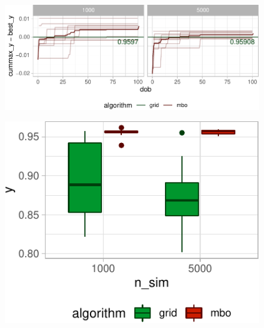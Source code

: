 \documentclass[bimj,fleqn]{w-art}
\theoremstyle{plain}
\theoremstyle{definition}
\begin{document}
\begin{figure}[htb]
\centering
  \begin{minipage}{0.64\textwidth}
    \centering
    \includegraphics[width=\linewidth]{generated/figures/plot_opt_path_5000.pdf}%
    \label{fig:plot_opt_path_5000}
  \end{minipage}\hspace{0.01\textwidth}%
  \begin{minipage}{0.35\textwidth}
    \centering
    \includegraphics[width=\linewidth]{generated/figures/plot_boxplot_valid_y_5000.pdf}%
    \label{fig:plot_boxplot_valid_y_5000}
  \end{minipage}
\end{figure}


\end{document}

